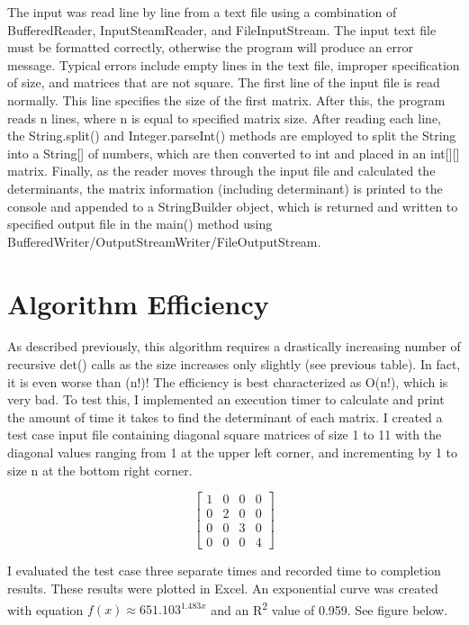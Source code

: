 \documentclass[12pt, titlepage]{article}
\begin{document}
The input was read line by line from a text file using a combination of BufferedReader, InputSteamReader, and FileInputStream. The input text file must be formatted correctly, otherwise the program will produce an error message. Typical errors include empty lines in the text file, improper specification of size, and matrices that are not square. The first line of the input file is read normally. This line specifies the size of the first matrix. After this, the program reads n lines, where n is equal to specified matrix size. After reading each line, the String.split() and Integer.parseInt() methods are employed to split the String into a String[] of numbers, which are then converted to int and placed in an int[][] matrix. Finally, as the reader moves through the input file and calculated the determinants, the matrix information (including determinant) is printed to the console and appended to a StringBuilder object, which is returned and written to specified output file in the main() method using BufferedWriter/OutputStreamWriter/FileOutputStream.

\section{Algorithm Efficiency}

As described previously, this algorithm requires a drastically increasing number of recursive det() calls as the size increases only slightly (see previous table). In fact, it is even worse than (n!)! The efficiency is best characterized as O(n!), which is very bad. To test this, I implemented an execution timer to calculate and print the amount of time it takes to find the determinant of each matrix. I created a test case input file containing diagonal square matrices of size 1 to 11 with the diagonal values ranging from 1 at the upper left corner, and incrementing by 1 to size n at the bottom right corner. 

\[
\begin{bmatrix}
    1 & 0 & 0 & 0 \\
    0 & 2 & 0 & 0 \\
    0 & 0 & 3 & 0 \\
    0 & 0 & 0 & 4
\end{bmatrix}
\]

I evaluated the test case three separate times and recorded time to completion results. These results were plotted in Excel. An exponential curve was created with equation $f(x) \approx 651.103^{1.483x}$ and an R\textsuperscript{2} value of 0.959. See figure below.
\end{document}
